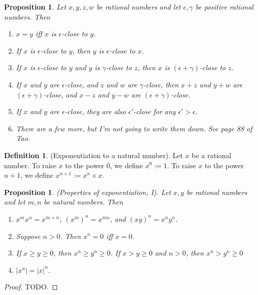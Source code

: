 \documentclass[12pt]{article}
\newtheorem{proposition}[theorem]{Proposition}
\theoremstyle{definition}
\newtheorem{definition}[theorem]{Definition}
\theoremstyle{remark}
\begin{document}
\begin{proposition}
    Let $x, y, z, w$ be rational numbers and let $\epsilon, \gamma$ be  positive rational numbers. Then
    \begin{enumerate}
        \item $x = y$ iff $x$ is $\epsilon$-close to $y$.
        \item If $x$ is $\epsilon$-close to $y$, then $y$ is $\epsilon$-close to $x$.
        \item If $x$ is $\epsilon$-close to $y$ and $y$ is $\gamma$-close to $z$, then $x$ is $(\epsilon + \gamma)$-close to $z$.
        \item If $x$ and $y$ are $\epsilon$-close, and $z$ and $w$ are $\gamma$-close, then $x+z$ and $y+w$ are $(\epsilon + \gamma)$-close, and $x-z$ and $y-w$ are $(\epsilon + \gamma)$-close. 
        \item If $x$ and $y$ are $\epsilon$-close, they are also $\epsilon'$-close for any $\epsilon' > \epsilon$.
        \item There are a few more, but I'm not going to write them down. See page 88 of Tao.
    \end{enumerate}
\end{proposition}

\begin{definition}
    (Exponentiation to a natural number). Let $x$ be a rational number. To raise $x$ to the power $0$, we define $x^0 := 1$. To raise $x$ to the power $n+1$, we define $x^{n+1} := x^n \times x$.
\end{definition}

\begin{proposition}
    (Properties of exponentiation, I). Let $x, y$ be rational numbers and let $m, n$ be natural numbers. Then
    \begin{enumerate}
        \item $x^m x^n = x^{m+n}$, $(x^m)^n = x^{mn}$, and $(xy)^n = x^n y^n$.
        \item Suppose $n > 0$. Then $x^n = 0$ iff $x = 0$.
        \item If $x \geq y \geq 0$, then $x^n \geq y^n \geq 0$. If $x > y \geq 0$ and $n >0$, then $x^n > y^n \geq 0$
        \item $|x^n| = |x|^n$.
    \end{enumerate}
\end{proposition}

\begin{proof}
    TODO.
\end{proof}
\end{document}
